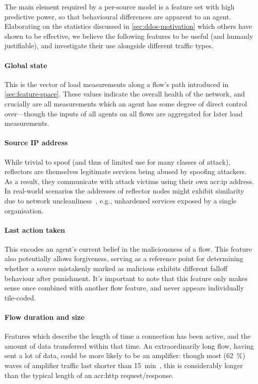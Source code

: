 The main element required by a per-source model is a feature set with high predictive power, so that behavioural differences are apparent to an agent.
Elaborating on the statistics discussed in \cref{sec:ddos-motivation} which others have shown to be effective, we believe the following features to be useful (and humanly justifiable), and investigate their use alongside different traffic types.

\paragraph{Global state}
This is the vector of load measurements along a flow's path introduced in \cref{sec:feature-space}.
These values indicate the overall health of the network, and crucially are all measurements which an agent has some degree of direct control over---though the inputs of all agents on all flows are aggregated for later load measurements.

\paragraph{Source IP address}
While trivial to spoof (and thus of limited use for many classes of attack), reflectors are themselves legitimate services being abused by spoofing attackers.
As a result, they communicate with attack victims using their own \gls{acr:ip} address.
In real-world scenarios the addresses of reflector nodes might exhibit similarity due to network uncleanliness~\parencite{DBLP:conf/imc/CollinsSFJWSK07}, e.g., unhardened services exposed by a single organisation.

\paragraph{Last action taken}
This encodes an agent's current belief in the maliciousness of a flow.
This feature also potentially allows forgiveness, serving as a reference point for determining whether a source mistakenly marked as malicious exhibits different falloff behaviour after punishment.
It's important to note that this feature only makes sense once combined with another flow feature, and never appears individually tile-coded.

\paragraph{Flow duration and size}
Features which describe the length of time a connection has been active, and the amount of data transferred within that time.
An extraordinarily long flow, having sent a lot of data, could be more likely to be an amplifier: though most (\qty{62}{\percent}) waves of amplifier traffic last shorter than \qty{15}{\minute}~\parencite{DBLP:conf/raid/KramerKMNKYR15}, this is considerably longer than the typical length of an \gls{acr:http} request/response.


